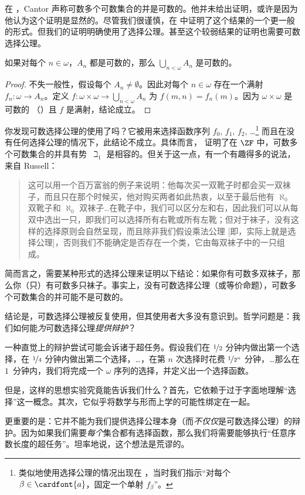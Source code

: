 \documentclass[../../../include/open-logic-section]{subfiles}
\begin{document}
\begin{ex}
在 \citeyear{Cantor1878}，Cantor 声称可数多个可数集合的并是可数的。他并未给出证明，或许是因为他认为这个证明是显然的。尽管我们很谨慎，在
 中证明了这个结果的一个更一般的形式。但我们的证明明确使用了选择公理。甚至这个较弱结果的证明也需要可数选择公理。

\begin{thm}
如果对每个 $n \in \omega$，$A_n$ 都是可数的，那么 $\bigcup_{n <
\omega} A_n$ 是可数的。
\end{thm}

\begin{proof}
不失一般性，假设每个 $A_n \neq \emptyset$。因此对每个 $n \in \omega$ 存在一个满射 $f_n \colon \omega
\to A_n$。定义 $f \colon \omega \times \omega \to \bigcup_{n <
\omega} A_n$ 为 $f(m, n) = f_n(m)$。因为 $\omega
\times \omega$ 是可数的
（）且 $f$ 是满射，结论成立。
\end{proof}
\noindent
你发现可数选择公理的使用了吗？它被用来选择函数序列 $f_0$, $f_1$, $f_2$, \dots\footnote{类似地使用选择公理的情况出现在
，当时我们指示“对每个 $\beta \in \cardfont{a}$，固定一个单射
$f_\beta$”。} 而且在没有任何选择公理的情况下，此结论不成立。具体而言，\citet{FefermanLevy1963} 证明了在 $\ZF$ 中，可数多个可数集合的并具有势~$\beth_1$ 是相容的。但关于这一点，有一个有趣得多的说法，来自 Russell：
\begin{quote}
  这可以用一个百万富翁的例子来说明：他每次买一双靴子时都会买一双袜子，而且只在那个时候买，他对购买两者如此热衷，以至于最后他有
  $\aleph_0$ 双靴子和 $\aleph_0$ 双袜子\dots\@ 在靴子中，我们可以区分左和右，因此我们可以从每双中选出一只，即我们可以选择所有右靴或所有左靴；但对于袜子，没有这样的选择原则会自然呈现，而且除非我们假设乘法公理 [即，实际上就是选择公理]，否则我们不能确定是否存在一个类，它由每双袜子中的一只组成。
  \citep[p.~126]{Russell1919}
\end{quote}
简而言之，需要某种形式的选择公理来证明以下结论：如果你有可数多双袜子，那么你（只）有可数多只袜子。事实上，没有可数选择公理（或等价命题），可数多个可数集合的并可能不是可数的。
\end{ex}

结论是，可数选择公理被反复使用，但其使用者大多没有意识到。哲学问题是：我们如何能\emph{为}可数选择公理\emph{提供辩护}？

一种直觉上的辩护尝试可能会诉诸于超任务。假设我们在 $\nicefrac{1}{2}$ 分钟内做出第一个选择，在 $\nicefrac{1}{4}$ 分钟内做出第二个选择，\dots，在第 $n$ 次选择时花费 $\nicefrac{1}{2^n}$ 分钟，\dots\@ 那么在 $1$~分钟内，我们将完成一个 $\omega$ 序列的选择，并定义出一个选择函数。

但是，这样的思想实验究竟能告诉我们什么？首先，它依赖于过于字面地理解“选择”这一概念。其次，它似乎将数学与形而上学的可能性绑定在一起。

更重要的是：它并不能为我们提供选择公理本身（而\emph{不仅仅}是可数选择公理）的辩护。因为如果我们需要\emph{每个}集合都有选择函数，那么我们将需要能够执行“任意序数长度的超任务”。坦率地说，这个想法是荒谬的。
\end{document}
